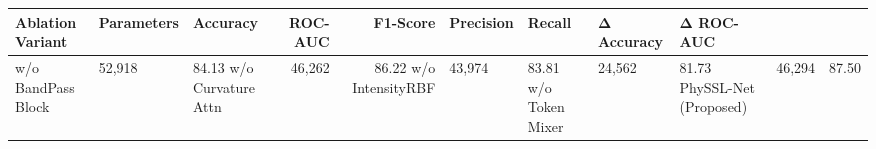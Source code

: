 \begin{tabular}{lllrrllll}
\toprule
Ablation Variant & Parameters & Accuracy & ROC-AUC & F1-Score & Precision & Recall & Δ Accuracy & Δ ROC-AUC \\
\midrule
w/o BandPass Block & 52,918 & 84.13%
w/o Curvature Attn & 46,262 & 86.22%
w/o IntensityRBF & 43,974 & 83.81%
w/o Token Mixer & 24,562 & 81.73%
PhySSL-Net (Proposed) & 46,294 & 87.50%
\bottomrule
\end{tabular}
